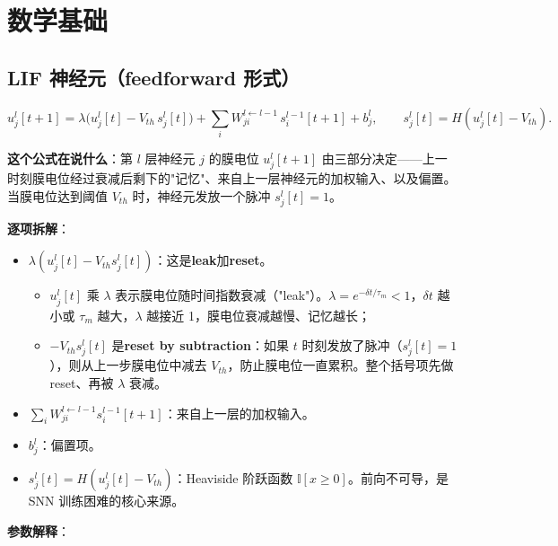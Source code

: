 \documentclass[journal,12pt,onecolumn]{IEEEtran}
\begin{document}
\section{数学基础}

\subsection{LIF 神经元（feedforward 形式）}

\begin{equation}
u_j^l[t+1]=\lambda\big(u_j^l[t]-V_{th}\,s_j^l[t]\big)+\sum_i W_{ji}^{l\leftarrow l-1}\,s_i^{l-1}[t+1]+b_j^l,
\qquad
s_j^l[t]=H(u_j^l[t]-V_{th}).
\end{equation}

\textbf{这个公式在说什么}：第 $l$ 层神经元 $j$ 的膜电位 $u_j^l[t+1]$ 由三部分决定——上一时刻膜电位经过衰减后剩下的"记忆"、来自上一层神经元的加权输入、以及偏置。当膜电位达到阈值 $V_{th}$ 时，神经元发放一个脉冲 $s_j^l[t]=1$。

\textbf{逐项拆解}：

\begin{itemize}[leftmargin=1.5em,itemsep=0pt]
\item $\lambda(u_j^l[t]-V_{th}s_j^l[t])$：这是\textbf{leak}加\textbf{reset}。
\begin{itemize}[leftmargin=1.2em,itemsep=0pt]
\item $u_j^l[t]$ 乘 $\lambda$ 表示膜电位随时间指数衰减（"leak"）。$\lambda=e^{-\delta t/\tau_m}<1$，$\delta t$ 越小或 $\tau_m$ 越大，$\lambda$ 越接近 1，膜电位衰减越慢、记忆越长；
\item $-V_{th}s_j^l[t]$ 是\textbf{reset by subtraction}：如果 $t$ 时刻发放了脉冲（$s_j^l[t]=1$），则从上一步膜电位中减去 $V_{th}$，防止膜电位一直累积。整个括号项先做 reset、再被 $\lambda$ 衰减。
\end{itemize}
\item $\sum_i W_{ji}^{l\leftarrow l-1}s_i^{l-1}[t+1]$：来自上一层的加权输入。
\item $b_j^l$：偏置项。
\item $s_j^l[t]=H(u_j^l[t]-V_{th})$：Heaviside 阶跃函数 $\mathbb I[x\ge 0]$。前向不可导，是 SNN 训练困难的核心来源。
\end{itemize}

\textbf{参数解释}：
\end{document}
